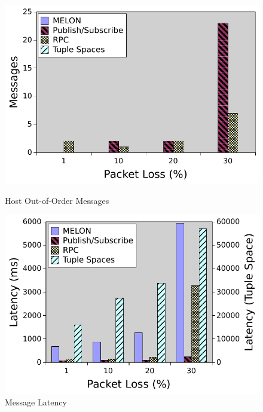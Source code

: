 \begin{figure}[ht]
\centering
\begin{minipage}[b]{0.48\linewidth}
\includegraphics[width = \textwidth]{figures/hooo.pdf}
\caption{Host Out-of-Order Messages}
\label{fig:hooo}
\end{minipage}
\quad
\begin{minipage}[b]{0.48\linewidth}

\includegraphics[width = \textwidth]{figures/latency.pdf}
\caption{Message Latency}
\label{fig:latency}
\end{minipage}
\end{figure}
